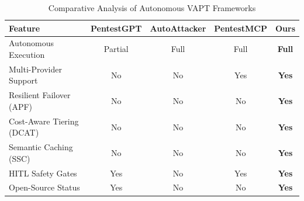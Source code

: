 \begin{table}[t]
\centering
\caption{Comparative Analysis of Autonomous VAPT Frameworks}
\label{tab:sota}
\begin{tabular}{l c c c c}
\toprule
\textbf{Feature} & \textbf{PentestGPT} & \textbf{AutoAttacker} & \textbf{PentestMCP} & \textbf{Ours} \\
\midrule
Autonomous Execution & Partial & Full & Full & \textbf{Full} \\
Multi-Provider Support & No & No & Yes & \textbf{Yes} \\
Resilient Failover (APF) & No & No & No & \textbf{Yes} \\
Cost-Aware Tiering (DCAT) & No & No & No & \textbf{Yes} \\
Semantic Caching (SSC) & No & No & No & \textbf{Yes} \\
HITL Safety Gates & Yes & No & Yes & \textbf{Yes} \\
\midrule
Open-Source Status & Yes & No & No & \textbf{Yes} \\
\bottomrule
\end{tabular}
\end{table}
